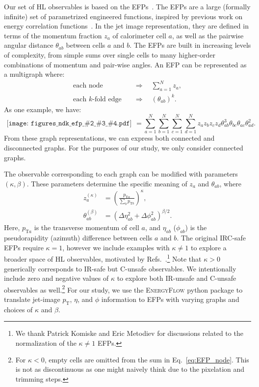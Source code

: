 \documentclass[aps,prd,twocolumn,superscriptaddress,preprintnumbers,nofootinbib,longbibliography,floatfix]{revtex4-1}
\newcommand{\rrefs}[1]{Refs.~\cite{#1}}
\newcommand{\Eq}[1]{Eq.~\eqref{#1}}
\newcommand{\ndk}[4]{
	\begin{gathered}\texttt{[image: figures\_ndk\_efp\_\#2\_\#3\_\#4.pdf]}\end{gathered}
}
\begin{document}
Our set of HL observables is based on the EFPs~\cite{Komiske:2017aww}. The EFPs are a large (formally infinite) set of parametrized engineered functions, inspired by previous work on energy correlation functions~\cite{Banfi:2004yd,GurAri:2011vx,Jankowiak:2011qa,Larkoski:2013eya,Larkoski:2014gra,Moult:2016cvt}. In the jet image representation, they are defined in terms of the momentum fraction $z_a$ of calorimeter cell $a$, as well as the pairwise angular distance $\theta_{ab}$ between cells $a$ and $b$. The EFPs are built in increasing levels of complexity, from simple sums over single cells to many higher-order combinations of momentum and pair-wise angles. An EFP can be represented as a multigraph where:
\begin{align}
	\text{each node} \quad          & \Longrightarrow \quad \sum_{a = 1}^N z_a, \label{eq:EFP_node}          \\
	\text{each $k$-fold edge} \quad & \Longrightarrow \quad \left(\theta_{ab}\right)^k \label{eq:EFP_edge} .
\end{align}
As one example, we have:
\begin{equation}
         \label{eq:g81}
	\ndk{0.045}{4}{7}{20} = \sum_{a=1}^N \sum_{b=1}^N \sum_{c=1}^N \sum_{d=1}^N z_a z_b z_c z_d \theta_{ab}^3 \theta_{bc} \theta_{ac} \theta_{ad}^2 .
\end{equation}
From these graph representations, we can express both connected and disconnected graphs. For the purposes of our study, we only consider connected graphs.

The observable corresponding to each graph can be modified with parameters $(\kappa, \beta)$. These parameters determine the specific meaning of $z_a$ and $\theta_{ab}$, where
\begin{align}
	z^{(\kappa)}_a        & = \left(\frac{p_{\textrm{T}a}}{\sum_b p_{\textrm{T}b}} \right)^\kappa, \label{eq:EFP_z} \\
	\theta^{(\beta)}_{ab} & = \left(\Delta \eta_{ab}^2 + \Delta \phi_{ab}^2 \right)^{\beta/2}. \label{eq:EFP_theta}
\end{align}
Here, $p_{\textrm{T}a}$ is the transverse momentum of cell $a$, and $\eta_{ab}$ ($\phi_{ab}$) is the pseudorapidity (azimuth) difference between cells $a$ and $b$. The original IRC-safe EFPs require $\kappa = 1$, however we include examples with $\kappa \not= 1$ to explore a broader space of HL observables, motivated by \rrefs{Pandolfi:2012ima,Chatrchyan:2012sn,Larkoski:2014pca,Gras:2017jty}.\footnote{We thank Patrick Komiske and Eric Metodiev for discussions related to the normalization of the $\kappa \not= 1$ EFPs.} Note that $\kappa > 0$ generically corresponds to IR-safe but C-unsafe observables. We intentionally include zero and negative values of $\kappa$ to explore both IR-unsafe and C-unsafe observables as well.\footnote{For $\kappa < 0$, empty cells are omitted from the sum in \Eq{eq:EFP_node}.  This is not as discontinuous as one might naively think due to the pixelation and trimming steps.} For our study, we use the \textsc{EnergyFlow} python package \cite{efpython}  to translate jet-image $p_\textrm{T}$, $\eta$, and $\phi$ information to EFPs with varying graphs and choices of $\kappa$ and $\beta$.
\end{document}
